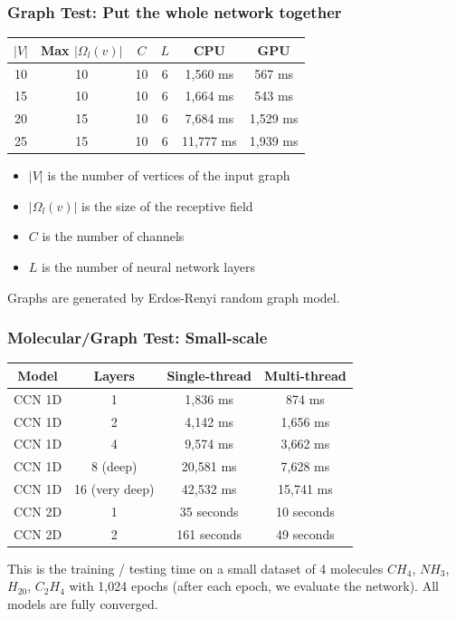 \documentclass{beamer}
\begin{document}
\begin{frame}
\frametitle{Graph Test: Put the whole network together}
\begin{center}
\begin{tabular}{|| c | c | c | c | c | c ||}
	\hline
	$|V|$ & Max $|\Omega_l(v)|$ & $C$ & $L$ & CPU & GPU \\
	\hline\hline
	10 & 10 & 10 & 6 & 1,560 ms & 567 ms \\
	\hline
	15 & 10 & 10 & 6 & 1,664 ms & 543 ms \\
	\hline 
	20 & 15 & 10 & 6 & 7,684 ms & 1,529 ms \\
	\hline
	25 & 15 & 10 & 6 & 11,777 ms & 1,939 ms \\
	\hline
\end{tabular}
\end{center}
\begin{itemize}
	\item $|V|$ is the number of vertices of the input graph
	\item $|\Omega_l(v)|$ is the size of the receptive field
	\item $C$ is the number of channels
	\item $L$ is the number of neural network layers
\end{itemize}
Graphs are generated by Erdos-Renyi random graph model.
\end{frame}

\begin{frame}
\frametitle{Molecular/Graph Test: Small-scale}
\begin{center}
\begin{tabular}{|| c | c | c | c ||}	
	\hline
	Model & Layers & Single-thread & Multi-thread \\
	\hline\hline
	CCN 1D & 1 & 1,836 ms & 874 ms \\
	\hline
	CCN 1D & 2 & 4,142 ms & 1,656 ms\\
	\hline
	CCN 1D & 4 & 9,574 ms & 3,662 ms \\
	\hline
	CCN 1D & 8 (deep) & 20,581 ms & 7,628 ms \\
	\hline
	CCN 1D & 16 (very deep) & 42,532 ms & 15,741 ms\\
	\hline
	CCN 2D & 1 & 35 seconds & 10 seconds \\
	\hline
	CCN 2D & 2 & 161 seconds & 49 seconds \\
	\hline
\end{tabular}
\end{center}
This is the training / testing time on a small dataset of 4 molecules $CH_4$, $NH_3$, $H_20$, $C_2H_4$ with 1,024 epochs (after each epoch, we evaluate the network). All models are fully converged.
\end{frame}
\end{document}

